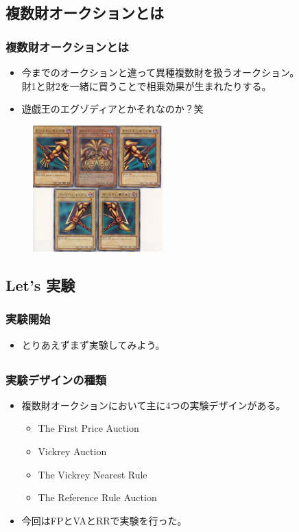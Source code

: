 \documentclass[dvipdfmx,12pt]{beamer}
\begin{document}
\subsection{複数財オークションとは}
\begin{frame}
\frametitle{複数財オークションとは}
\begin{itemize}\setlength{\parskip}{0.5em}
\item
今までのオークションと違って異種複数財を扱うオークション。\\
財1と財2を一緒に買うことで相乗効果が生まれたりする。\pause
\item
遊戯王のエグゾディアとかそれなのか？笑
\end{itemize}
\begin{figure}
\centering
\includegraphics[width=50mm]{yuugi.jpg}
\label{fig:jukyuu}
\end{figure}
\end{frame}


\subsection{Let's 実験}
\begin{frame}
\frametitle{実験開始}
\begin{itemize}\setlength{\parskip}{0.5em}
\item
とりあえずまず実験してみよう。
\end{itemize}
\end{frame}

\subsection{}
\begin{frame}
\frametitle{実験デザインの種類}
\begin{itemize}\setlength{\parskip}{0.5em}
\item
複数財オークションにおいて主に4つの実験デザインがある。\pause
\begin{itemize}\setlength{\parskip}{0.5em}
\item
The First Price Auction\pause
\item
Vickrey Auction\pause
\item
The Vickrey Nearest Rule\pause
\item
The Reference Rule Auction\pause
\end{itemize}
\item
今回はFPとVAとRRで実験を行った。
\end{itemize}
\end{frame}
\end{document}
